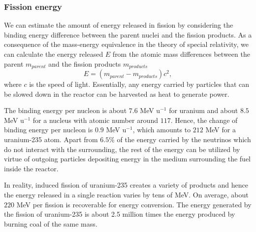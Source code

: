 \documentclass[nofootinbib,preprint,aps]{revtex4-1}
\begin{document}
        \subsubsection{Fission energy}
        We can estimate the amount of energy released in fission by considering the binding energy difference
        between the parent nuclei and the fission products. As a consequence of the mass-energy equivalence in the theory
        of special relativity, we can calculate the energy released $E$ from the atomic mass differences between the parent $m_{parent}$
        and the fission products $m_{products}$
        \begin{equation}
            E = (m_{parent}-m_{products})c^2,
        \end{equation}
        where $c$ is the speed of light.
        Essentially, any energy carried by particles that can be slowed down 
        in the reactor can be harvested as heat to generate power.

        The binding energy per nucleon is about $7.6$ MeV u${}^{-1}$ for uranium and about $8.5$ MeV u${}^{-1}$
        for a nucleus with atomic number around $117$. Hence, the change of binding energy per nucleon is
        $0.9$ MeV u${}^{-1}$, which amounts to $212$ MeV for a uranium-235 atom.
        Apart from $6.5\%$ of the energy carried by the neutrinos which do not interact with the surrounding,
        the rest of the energy can be utilized by virtue of outgoing particles depositing energy in the medium
        surrounding the fuel inside the reactor.

        In reality, induced fission of uranium-235 creates a variety of products and hence the energy released
        in a single reaction varies by tens of MeV. On average, about $220$ MeV per fission is recoverable for energy conversion.
        The energy generated by the fission of uranium-235 is 
        about 2.5 million times the energy produced by burning coal of the same mass.\cite{e17}
\end{document}
